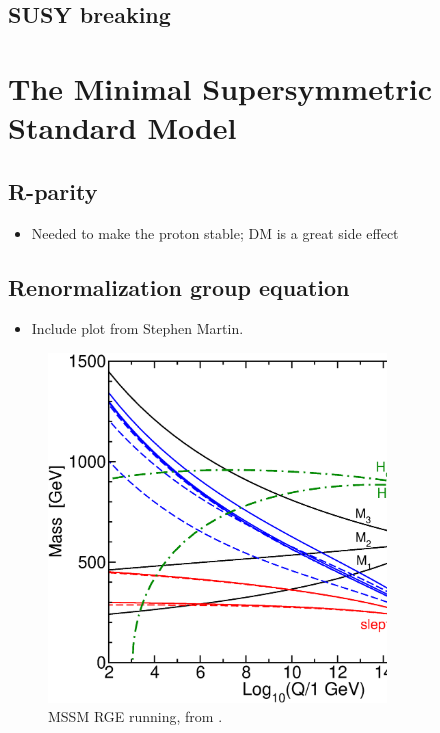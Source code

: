 \documentclass[twoside,english]{uiofysmaster}
\begin{document}
\subsection{SUSY breaking}




\section{The Minimal Supersymmetric Standard Model}
\subsection{R-parity}
\begin{itemize}
	\item Needed to make the proton stable; DM is a great side effect
\end{itemize}

\subsection{Renormalization group equation}
\begin{itemize}
	\item Include plot from Stephen Martin. 
\end{itemize}

\begin{figure}[hbt]
	\centering
	\includegraphics[width=0.8\textwidth]{figures/susyintro/MSSMrun.eps}
	\caption{MSSM RGE running, from \cite{Martin:1997ns}.}
	\label{fig:mssm_rgerun}
\end{figure}
\end{document}
